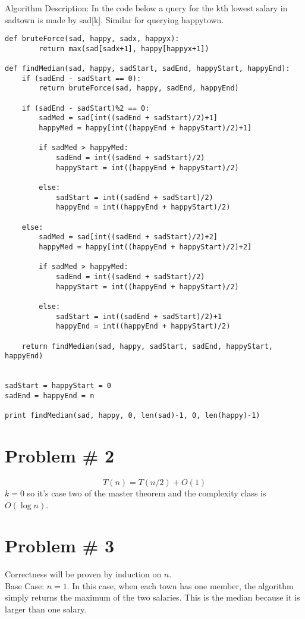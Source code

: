 \documentclass{article}
\begin{document}
Algorithm Description:
In the code below a query for the kth lowest salary in sadtown is made by sad[k]. Similar for querying happytown.
\begin{lstlisting}
def bruteForce(sad, happy, sadx, happyx):
        return max(sad[sadx+1], happy[happyx+1])
            
def findMedian(sad, happy, sadStart, sadEnd, happyStart, happyEnd):
    if (sadEnd - sadStart == 0):
        return bruteForce(sad, happy, sadEnd, happyEnd)

    if (sadEnd - sadStart)%2 == 0:
        sadMed = sad[int((sadEnd + sadStart)/2)+1]
        happyMed = happy[int((happyEnd + happyStart)/2)+1]
    
        if sadMed > happyMed:
            sadEnd = int((sadEnd + sadStart)/2)
            happyStart = int((happyEnd + happyStart)/2)

        else:
            sadStart = int((sadEnd + sadStart)/2)
            happyEnd = int((happyEnd + happyStart)/2)

    else:
        sadMed = sad[int((sadEnd + sadStart)/2)+2]
        happyMed = happy[int((happyEnd + happyStart)/2)+2]

        if sadMed > happyMed:
            sadEnd = int((sadEnd + sadStart)/2)
            happyStart = int((happyEnd + happyStart)/2)

        else:
            sadStart = int((sadEnd + sadStart)/2)+1
            happyEnd = int((happyEnd + happyStart)/2)

    return findMedian(sad, happy, sadStart, sadEnd, happyStart, happyEnd)


sadStart = happyStart = 0
sadEnd = happyEnd = n

print findMedian(sad, happy, 0, len(sad)-1, 0, len(happy)-1)
\end{lstlisting}

\section*{Problem \# 2}
$$T(n) = T(n/2) + O(1)$$
$k = 0$ so it's case two of the master theorem and the complexity class is $O(\log n)$.

\section*{Problem \# 3}
Correctness will be proven by induction on $n$. \\
Base Case: $n = 1$. In this case, when each town has one member, the algorithm simply returns the maximum of the two salaries. This is the median because it is larger than one salary. 
\end{document}
